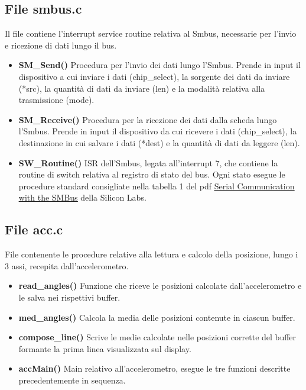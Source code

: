 \documentclass[11pt]{article}
\begin{document}
\subsection*{File smbus.c}
Il file contiene l'interrupt service routine relativa al Smbus, necessarie per l'invio e ricezione di dati lungo il bus.
\begin{itemize}
\item \textbf{SM\_Send()} Procedura per l'invio dei dati lungo l'Smbus. Prende in input il dispositivo a cui inviare i dati (chip\_select), la sorgente dei dati da inviare (*src), la quantità di dati da inviare (len) e la modalità relativa alla trasmissione (mode).
\item \textbf{SM\_Receive()} Procedura per la ricezione dei dati dalla scheda lungo l'Smbus. Prende in input il dispositivo da cui ricevere i dati (chip\_select), la destinazione in cui salvare i dati (*dest) e la quantità di dati da leggere (len).
\item \textbf{SW\_Routine()} ISR dell'Smbus, legata all'interrupt 7, che contiene la routine di switch relativa al registro di stato del bus. Ogni stato esegue le procedure standard consigliate nella tabella 1 del pdf \href{https://www.silabs.com/documents/public/application-notes/an113.pdf} {\underline{Serial Communication with the SMBus}} della Silicon Labs. 
\end{itemize}

\subsection*{File acc.c}
File contenente le procedure relative alla lettura e calcolo della posizione, lungo i 3 assi, recepita dall'accelerometro.
\begin{itemize}
\item \textbf{read\_angles()} Funzione che riceve le posizioni calcolate dall'accelerometro e le salva nei rispettivi buffer.
\item \textbf{med\_angles()} Calcola la media delle posizioni contenute in ciascun buffer.
\item \textbf{compose\_line()} Scrive le medie calcolate nelle posizioni corrette del buffer formante la prima linea visualizzata sul display.
\item \textbf{accMain()} Main relativo all'accelerometro, esegue le tre funzioni descritte precedentemente in sequenza.
\end{itemize}
\end{document}
